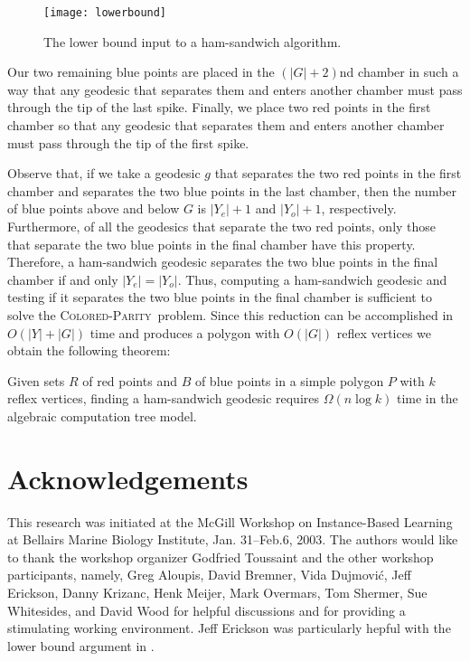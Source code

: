 \documentclass[charterfonts,lotsofwhite]{patmorin}
\newcommand{\parity}{\textsc{Colored-Parity}}
\begin{document}
\begin{figure}[htbp]
\begin{center}\texttt{[image: lowerbound]}\end{center}
\caption{The lower bound input to a ham-sandwich algorithm.}
\end{figure}

Our two remaining blue points are placed in the $(|G|+2)$nd chamber in
such a way that any geodesic that separates them and enters another
chamber must pass through the tip of the last spike.  Finally, we
place two red points in the first chamber so that any geodesic that
separates them and enters another chamber must pass through the tip of
the first spike.

Observe that, if we take a geodesic $g$ that separates the two red
points in the first chamber and separates the two blue points in the
last chamber, then the number of blue points above and below $G$ is
$|Y_e|+1$ and $|Y_o|+1$, respectively.  Furthermore, of all the
geodesics that separate the two red points, only those that separate
the two blue points in the final chamber have this property.
Therefore, a ham-sandwich geodesic separates the two blue points in
the final chamber if and only $|Y_e|=|Y_o|$.  Thus, computing a
ham-sandwich geodesic and testing if it separates the two blue points
in the final chamber is sufficient to solve the \parity\ problem.
Since this reduction can be accomplished in $O(|Y|+|G|)$ time and
produces a polygon with $O(|G|)$ reflex vertices we obtain the
following theorem:

\begin{thm}
Given sets $R$ of red points and $B$ of blue points in a simple
polygon $P$ with $k$ reflex vertices, finding a ham-sandwich geodesic
requires $\Omega(n\log k)$ time in the algebraic computation tree
model.
\end{thm}


\section*{Acknowledgements}

This research was initiated at the McGill Workshop on 
Instance-Based Learning at Bellairs Marine Biology Institute, Jan.
31--Feb.6, 2003.  The authors would like to thank the workshop
organizer Godfried Toussaint and the other workshop
participants, namely, 
   Greg Aloupis,
   David Bremner,
   Vida Dujmovi\'c,
   Jeff Erickson,
   Danny Krizanc,
   Henk Meijer,
   Mark Overmars,
   Tom Shermer,
   Sue Whitesides, 
and
   David Wood for helpful
discussions and for providing a stimulating working environment.  Jeff
Erickson was particularly hepful with the lower bound argument in
.



\end{document}
